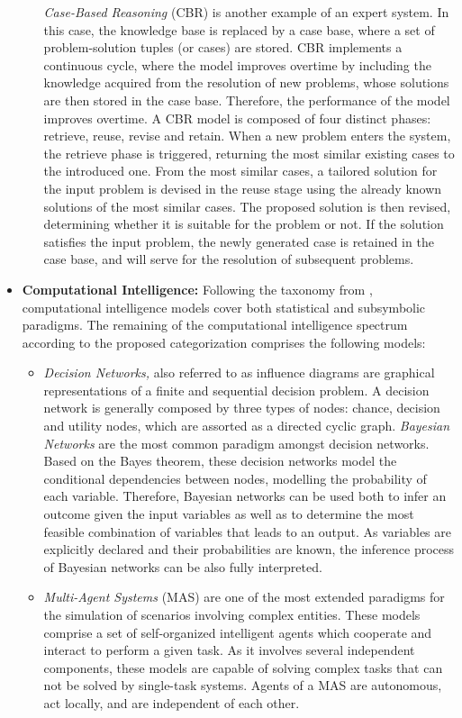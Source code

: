 \begin{itemize}
\begin{itemize}
        \textit{Case-Based Reasoning} (CBR) \citep{overview_cbr} is another example of an expert system. In this case, the knowledge base is replaced by a case base, where a set of problem-solution tuples (or cases) are stored. CBR implements a continuous cycle, where the model improves overtime by including the knowledge acquired from the resolution of new problems, whose solutions are then stored in the case base. Therefore, the performance of the model improves overtime. A CBR model is composed of four distinct phases: retrieve, reuse, revise and retain. When a new problem enters the system, the retrieve phase is triggered, returning the most similar existing cases to the introduced one. From the most similar cases, a tailored solution for the input problem is devised in the reuse stage using the already known solutions of the most similar cases. The proposed solution is then revised, determining whether it is suitable for the problem or not. If the solution satisfies the input problem, the newly generated case is retained in the case base, and will serve for the resolution of subsequent problems.   
    \end{itemize}
    \item \textbf{Computational Intelligence:} Following the taxonomy from \cite{hopgood_2009_knowledge-based}, computational intelligence models cover both statistical and subsymbolic paradigms. The remaining of the computational intelligence spectrum according to the proposed categorization comprises the following models:
    \begin{itemize}
        \item \textit{Decision Networks,} also referred to as influence diagrams \citep{poole_2017_ai_foundations} are graphical representations of a finite and sequential decision problem. A decision network is generally composed by three types of nodes: chance, decision and utility nodes, which are assorted as a directed cyclic graph. \textit{Bayesian Networks} \citep{friedman_1997_bayesian} are the most common paradigm amongst decision networks. Based on the Bayes theorem, these decision networks model the conditional dependencies between nodes, modelling the probability of each variable. Therefore, Bayesian networks can be used both to infer an outcome given the input variables as well as to determine the most feasible combination of variables that leads to an output. As variables are explicitly declared and their probabilities are known, the inference process of Bayesian networks can be also fully interpreted.
        \item \textit{Multi-Agent Systems} (MAS) \citep{Ferber:1999:MSI:520715} are one of the most extended paradigms for the simulation of scenarios involving complex entities. These models comprise a set of self-organized intelligent agents which cooperate and interact to perform a given task. As it involves several independent components, these models are capable of solving complex tasks that can not be solved by single-task systems. Agents of a MAS are autonomous, act locally, and are independent of each other. 

\end{itemize}
\end{itemize}
